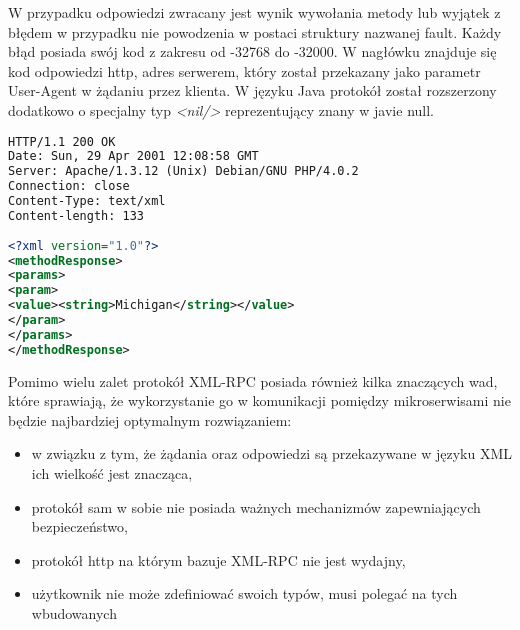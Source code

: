 W przypadku odpowiedzi zwracany jest wynik wywołania metody lub wyjątek z błędem w przypadku nie powodzenia w postaci struktury nazwanej fault. Każdy błąd posiada swój kod z zakresu od -32768 do -32000. W nagłówku znajduje się kod odpowiedzi http, adres serwerem, który został przekazany jako parametr  User-Agent w żądaniu przez klienta. W języku Java protokół został rozszerzony dodatkowo o specjalny typ \textit{<nil/>} reprezentujący znany w javie null.

\begin{lstlisting}[language=XML, caption=Przykład odpowiedzi serwera]
HTTP/1.1 200 OK   
Date: Sun, 29 Apr 2001 12:08:58 GMT
Server: Apache/1.3.12 (Unix) Debian/GNU PHP/4.0.2  
Connection: close  
Content-Type: text/xml  
Content-length: 133  
 
<?xml version="1.0"?> 
<methodResponse> 
<params> 
<param> 
<value><string>Michigan</string></value> 
</param> 
</params> 
</methodResponse> 
\end{lstlisting}
\noindent
Pomimo wielu zalet protokół XML-RPC posiada również kilka znaczących wad, które sprawiają, że wykorzystanie go w komunikacji pomiędzy mikroserwisami nie będzie najbardziej optymalnym rozwiązaniem:
\begin{itemize}
	\item w związku z tym, że żądania oraz odpowiedzi są przekazywane w języku XML ich wielkość jest znacząca,
	\item protokół sam w sobie nie posiada ważnych mechanizmów zapewniających bezpieczeństwo,
	\item protokół http na którym bazuje XML-RPC nie jest wydajny,
	\item użytkownik nie może zdefiniować swoich typów, musi polegać na tych wbudowanych
\end{itemize}
